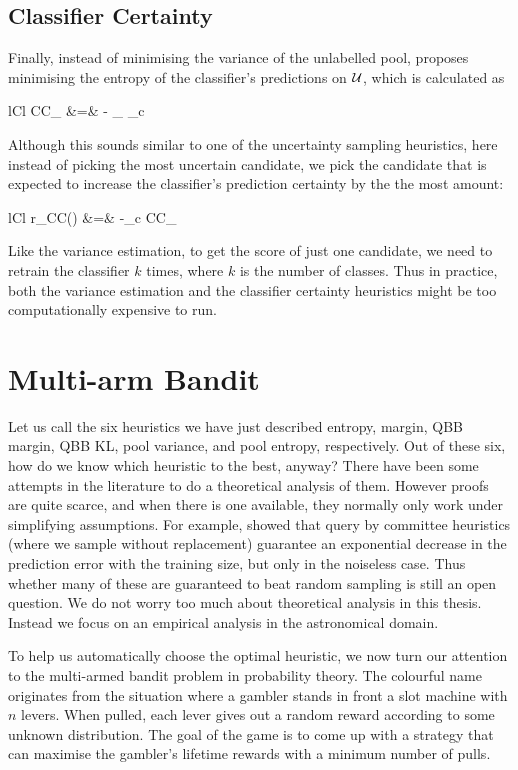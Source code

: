 \subsection{Classifier Certainty}
Finally, instead of minimising the variance of the unlabelled pool,  proposes
minimising the entropy of the classifier's predictions on $\mathcal{U}$, which is calculated as
	\begin{IEEEeqnarray*}{lCl}
		CC_{\Labelled} &=& - \sum_{ \in \Unlabelled} \sum_{c \in \Y}  \log \big[\Prob{y(\bm{u}) = c} \big]
	\end{IEEEeqnarray*}
Although this sounds
similar to one of the uncertainty sampling heuristics, here instead of picking the 
most uncertain candidate, we pick the candidate that is expected to increase the classifier's
prediction certainty by the the most amount:
	\begin{IEEEeqnarray*}{lCl}
		r_{CC}() &=& -\sum_{c\in \Y}  CC_{\Labelled \cup {}}
	\end{IEEEeqnarray*}
Like the variance estimation, to get the score of just one candidate, we need to retrain the
classifier $k$ times, where $k$ is the number of classes. Thus in practice, both the variance
estimation and the classifier certainty heuristics might be too computationally expensive to run.


\section{Multi-arm Bandit}
Let us call the six heuristics we have just described entropy, margin, QBB margin, QBB KL,
pool variance, and pool entropy, respectively. Out of these six, how
do we know which  heuristic to the best, anyway?
There have been some attempts in the literature to do a theoretical analysis of them.
However proofs are quite scarce, and when there is one available, they normally only
work under simplifying assumptions. For example,  showed that 
query by committee heuristics (where we sample without replacement) guarantee
an exponential decrease in the prediction error with the training size, but only in
the noiseless case.
Thus whether many of these are guaranteed to beat random sampling is still an open question.
We do not worry too much about theoretical analysis in this thesis. Instead we focus on
an empirical analysis in the astronomical domain.

To help us automatically choose the optimal heuristic, 
we now turn our attention to the multi-armed bandit problem in probability theory. The colourful
name originates from the situation where a gambler stands in front a slot machine with $n$ levers.
When pulled, each lever gives out a random reward according to some unknown distribution.
The goal of the game is to come up with a strategy that can maximise the gambler's
lifetime rewards with a minimum number of pulls.

